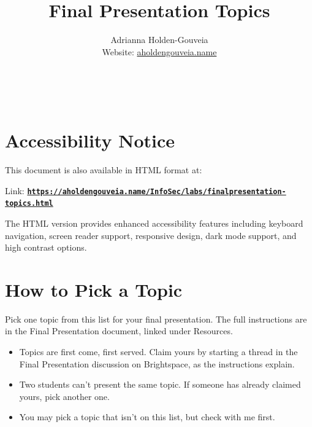 \documentclass[12pt]{article}
\title{Final Presentation Topics}
\author{
        Adrianna Holden-Gouveia \\
        Website: \href{https://aholdengouveia.name}{aholdengouveia.name}\\ 
        \date{\vspace{-5ex}}
        \faGithub {: aholdengouveia} \\
        \faTwitter {: aholdengouveia} \\
        }
\begin{document}
\maketitle

\section*{Accessibility Notice}
This document is also available in HTML format at:

Link: \href{https://aholdengouveia.name/InfoSec/labs/finalpresentation-topics.html}{\textbf{\nolinkurl{https://aholdengouveia.name/InfoSec/labs/finalpresentation-topics.html}}}

The HTML version provides enhanced accessibility features including keyboard navigation, screen reader support, responsive design, dark mode support, and high contrast options.

\section*{How to Pick a Topic}
Pick one topic from this list for your final presentation. The full instructions are in the Final Presentation document, linked under Resources.
\begin{itemize}
    \item Topics are first come, first served. Claim yours by starting a thread in the Final Presentation discussion on Brightspace, as the instructions explain.
    \item Two students can't present the same topic. If someone has already claimed yours, pick another one.
    \item You may pick a topic that isn't on this list, but check with me first.
\end{itemize}
\end{document}
